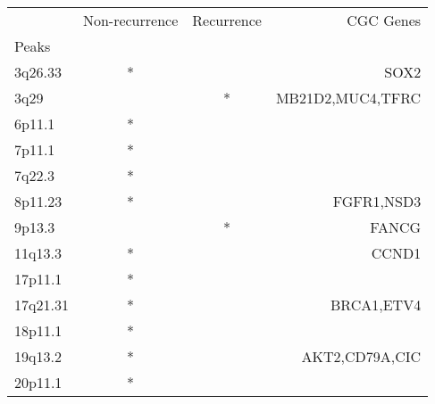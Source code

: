 \begin{tabular}{lccr}
\toprule
{} & Non-recurrence & Recurrence &         CGC Genes \\
Peaks    &                &            &                   \\
\midrule
3q26.33  &              * &            &              SOX2 \\
3q29     &                &          * &  MB21D2,MUC4,TFRC \\
6p11.1   &              * &            &                   \\
7p11.1   &              * &            &                   \\
7q22.3   &              * &            &                   \\
8p11.23  &              * &            &        FGFR1,NSD3 \\
9p13.3   &                &          * &             FANCG \\
11q13.3  &              * &            &             CCND1 \\
17p11.1  &              * &            &                   \\
17q21.31 &              * &            &        BRCA1,ETV4 \\
18p11.1  &              * &            &                   \\
19q13.2  &              * &            &    AKT2,CD79A,CIC \\
20p11.1  &              * &            &                   \\
\bottomrule
\end{tabular}
